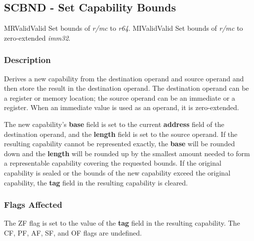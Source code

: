 \clearpage
{}
{}
\subsection*{SCBND - Set Capability Bounds}

\begin{x86opcodetable}
  {MR}{Valid}{Valid}
  {Set bounds of \emph{r/mc} to \emph{r64}.}
  {MI}{Valid}{Valid}
  {Set bounds of \emph{r/mc} to zero-extended \emph{imm32}.}
\end{x86opcodetable}

\begin{x86opentable}
\end{x86opentable}

\subsubsection*{Description}

Derives a new capability from the destination operand and source
operand and then store the result in the destination operand.  The
destination operand can be a register or memory location; the source
operand can be an immediate or a register.  When an immediate value is
used as an operand, it is zero-extended.

The new capability's \textbf{base} field is set to the current
\textbf{address} field of the destination operand, and the
\textbf{length} field is set to the source operand.  If the resulting
capability cannot be represented exactly, the \textbf{base} will be
rounded down and the \textbf{length} will be rounded up by the
smallest amount needed to form a representable capability covering the
requested bounds.  If the original capability is sealed or the bounds
of the new capability exceed the original capability, the \textbf{tag}
field in the resulting capability is cleared.

\subsubsection*{Flags Affected}

The ZF flag is set to the value of the \textbf{tag} field in the
resulting capability.  The CF, PF, AF, SF, and OF flags are undefined.
